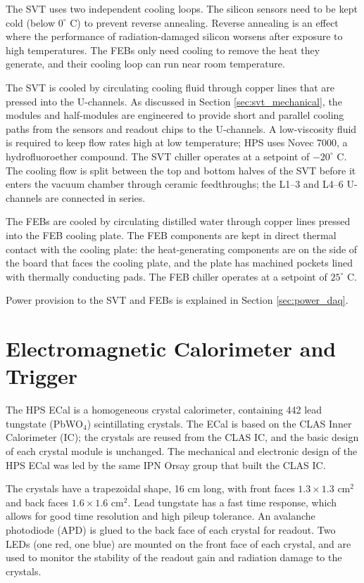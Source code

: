 The SVT uses two independent cooling loops.
The silicon sensors need to be kept cold (below $0^\circ$ C) to prevent reverse annealing.
Reverse annealing is an effect where the performance of radiation-damaged silicon worsens after exposure to high temperatures.
The FEBs only need cooling to remove the heat they generate, and their cooling loop can run near room temperature.

The SVT is cooled by circulating cooling fluid through copper lines that are pressed into the U-channels.
As discussed in Section \ref{sec:svt_mechanical}, the modules and half-modules are engineered to provide short and parallel cooling paths from the sensors and readout chips to the U-channels.
A low-viscosity fluid is required to keep flow rates high at low temperature; HPS uses Novec 7000, a hydrofluoroether compound.
The SVT chiller operates at a setpoint of $-20^\circ$ C.
The cooling flow is split between the top and bottom halves of the SVT before it enters the vacuum chamber through ceramic feedthroughs; the L1--3 and L4--6 U-channels are connected in series.

The FEBs are cooled by circulating distilled water through copper lines pressed into the FEB cooling plate.
The FEB components are kept in direct thermal contact with the cooling plate: the heat-generating components are on the side of the board that faces the cooling plate, and the plate has machined pockets lined with thermally conducting pads.
The FEB chiller operates at a setpoint of $25^\circ$ C.

Power provision to the SVT and FEBs is explained in Section \ref{sec:power_daq}.

\section{Electromagnetic Calorimeter and Trigger}
The HPS ECal is a homogeneous crystal calorimeter, containing 442 lead tungstate (PbWO$_4$) scintillating crystals.
The ECal is based on the CLAS Inner Calorimeter (IC); the crystals are reused from the CLAS IC, and the basic design of each crystal module is unchanged.
The mechanical and electronic design of the HPS ECal was led by the same IPN Orsay group that built the CLAS IC.

The crystals have a trapezoidal shape, 16 cm long, with front faces $1.3\times 1.3$ cm$^2$ and back faces $1.6\times 1.6$ cm$^2$.
Lead tungstate has a fast time response, which allows for good time resolution and high pileup tolerance.
An avalanche photodiode (APD) is glued to the back face of each crystal for readout.
Two LEDs (one red, one blue) are mounted on the front face of each crystal, and are used to monitor the stability of the readout gain and radiation damage to the crystals.

